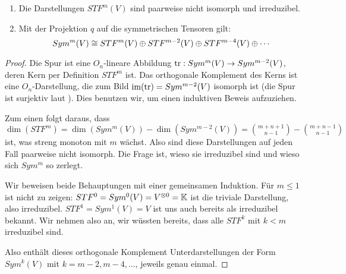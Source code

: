 \begin{theorem}
\begin{enumerate}
\item Die Darstellungen $STF^m(V)$ sind paarweise nicht isomorph und irreduzibel.
\item Mit der Projektion $q$ auf die symmetrischen Tensoren gilt:
\[Sym^m(V) \cong STF^m(V) \oplus STF^{m-2}(V) \oplus STF^{m-4}(V) \oplus \cdots\]
\end{enumerate}
\end{theorem}
\begin{proof}
Die Spur ist eine $O_n$-lineare Abbildung $\operatorname{tr}: Sym^m(V) \to Sym^{m-2}(V)$, deren Kern per Definition $STF^m$ ist. Das orthogonale Komplement des Kerns ist eine $O_n$-Darstellung, die zum Bild $\operatorname{im}(\operatorname{tr})=Sym^{m-2}(V)$ isomorph ist (die Spur ist surjektiv laut ). Dies benutzen wir, um einen induktiven Beweis aufzuziehen.

Zum einen folgt daraus, dass $\dim(STF^m) = \dim(Sym^m(V)) - \dim(Sym^{m-2}(V)) = \binom{m+n+1}{n-1} - \binom{m+n-1}{n-1}$ ist, was streng monoton mit $m$ wächst. Also sind diese Darstellungen auf jeden Fall paarweise nicht isomorph. Die Frage ist, wieso sie irreduzibel sind und wieso sich $Sym^m$ so zerlegt.

\medbreak
Wir beweisen beide Behauptungen mit einer gemeinsamen Induktion. Für $m\leq 1$ ist nicht zu zeigen: $STF^0 = Sym^0(V) = V^{\otimes 0} = \mathbb{K}$ ist die triviale Darstellung, also irreduzibel. $STF^1 = Sym^1(V) = V$ ist uns auch bereits als irreduzibel bekannt. Wir nehmen also an, wir wüssten bereits, dass alle $STF^k$ mit $k<m$ irreduzibel sind.

Also enthält dieses orthogonale Komplement Unterdarstellungen der Form $Sym^k(V)$ mit $k=m-2, m-4, ...$, jeweils genau einmal.





\end{proof}